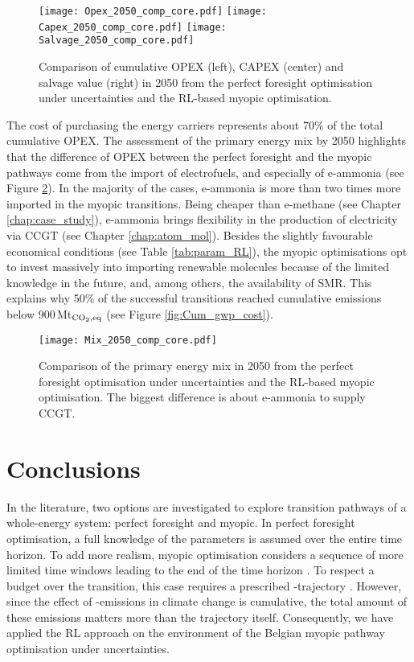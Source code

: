 \begin{figure}[!htbp]
\centering
\texttt{[image: Opex\_2050\_comp\_core.pdf]}
\texttt{[image: Capex\_2050\_comp\_core.pdf]}
\texttt{[image: Salvage\_2050\_comp\_core.pdf]}
\caption{Comparison of cumulative OPEX (left), CAPEX (center) and salvage value (right) in 2050 from the perfect foresight optimisation under uncertainties and the \gls{RL}-based myopic optimisation.}
\label{fig:Opex_Capex_Salvage_comp}
\end{figure}

The cost of purchasing the energy carriers represents about 70\% of the total cumulative \gls{OPEX}. The assessment of the primary energy mix by 2050 highlights that the difference of OPEX between the perfect foresight and the myopic pathways come from the import of electrofuels, and especially of e-ammonia (see Figure \ref{fig:Mix_2050_comp}).  In the majority of the cases, e-ammonia is more than two times more imported in the myopic transitions. Being cheaper than e-methane (see Chapter \ref{chap:case_study}), e-ammonia brings flexibility in the production of electricity via \gls{CCGT} (see Chapter \ref{chap:atom_mol}). Besides the slightly favourable economical conditions (see Table \ref{tab:param_RL}), the myopic optimisations opt to invest massively into importing renewable molecules because of the limited knowledge in the future, and, among others, the availability of \gls{SMR}. This explains why 50\% of the successful transitions reached cumulative emissions below 900\,Mt$_{\ce{CO2},\text{eq}}$ (see Figure \ref{fig:Cum_gwp_cost}).

\begin{figure}[!htbp]
\centering
\texttt{[image: Mix\_2050\_comp\_core.pdf]}
\caption{Comparison of the primary energy mix in 2050 from the perfect foresight optimisation under uncertainties and the \gls{RL}-based myopic optimisation. The biggest difference is about e-ammonia to supply \gls{CCGT}.}
\label{fig:Mix_2050_comp}
\end{figure}


\section{Conclusions}
\label{sec:RL:conclusions}
In the literature, two options are investigated to explore transition pathways of a whole-energy system: perfect foresight and myopic. In perfect foresight optimisation, a full knowledge of the parameters is assumed over the entire time horizon. To add more realism, myopic optimisation considers a sequence of more limited time windows leading to the end of the time horizon \cite{poncelet2016myopic}. To respect a  budget over the transition, this case requires a prescribed -trajectory \cite{fais2016impact}. However, since the effect of -emissions in climate change is cumulative, the total amount of these emissions matters more than the trajectory itself. Consequently, we have applied the \acrfull{RL} approach on the environment of the Belgian myopic pathway optimisation under uncertainties.

